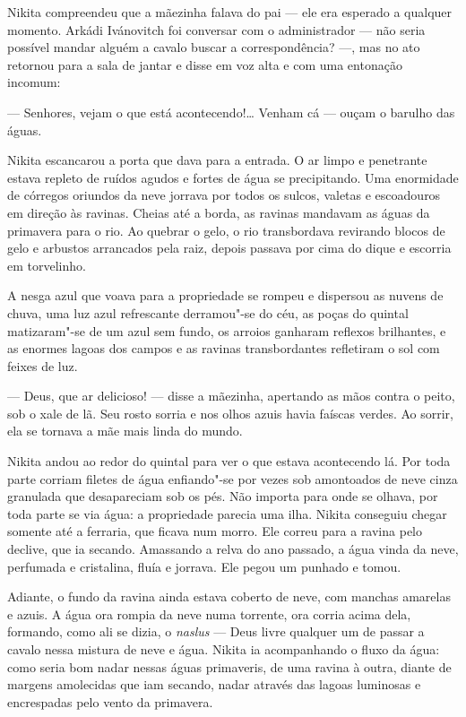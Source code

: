 Nikita compreendeu que a mãezinha falava do pai --- ele era esperado a
qualquer momento. Arkádi Ivánovitch foi conversar com o administrador
--- não seria possível mandar alguém a cavalo buscar a correspondência?
---, mas no ato retornou para a sala de jantar e disse em voz alta e com
uma entonação incomum:

--- Senhores, vejam o que está acontecendo!\ldots{} Venham cá --- ouçam o
barulho das águas.

Nikita escancarou a porta que dava para a entrada. O ar limpo e
penetrante estava repleto de ruídos agudos e fortes de água se
precipitando. Uma enormidade de córregos oriundos da neve jorrava por
todos os sulcos, valetas e escoadouros em direção às ravinas. Cheias até
a borda, as ravinas mandavam as águas da primavera para o rio. Ao quebrar
o gelo, o rio transbordava revirando blocos de gelo e arbustos
arrancados pela raiz, depois passava por cima do dique e escorria em
torvelinho.

A nesga azul que voava para a propriedade se rompeu e dispersou as
nuvens de chuva, uma luz azul refrescante derramou"-se do céu, as poças
do quintal matizaram"-se de um azul sem fundo, os arroios ganharam
reflexos brilhantes, e as enormes lagoas dos campos e as ravinas
transbordantes refletiram o sol com feixes de luz.

--- Deus, que ar delicioso! --- disse a mãezinha, apertando as mãos
contra o peito, sob o xale de lã. Seu rosto sorria e nos olhos azuis
havia faíscas verdes. Ao sorrir, ela se tornava a mãe mais linda do
mundo.

Nikita andou ao redor do quintal para ver o que estava acontecendo lá.
Por toda parte corriam filetes de água enfiando"-se por vezes sob
amontoados de neve cinza granulada que desapareciam sob os pés. Não
importa para onde se olhava, por toda parte se via água: a propriedade
parecia uma ilha. Nikita conseguiu chegar somente até a ferraria, que
ficava num morro. Ele correu para a ravina pelo declive, que ia secando.
Amassando a relva do ano passado, a água vinda da neve, perfumada e
cristalina, fluía e jorrava. Ele pegou um punhado e tomou.

Adiante, o fundo da ravina ainda estava coberto de neve, com manchas
amarelas e azuis. A água ora rompia da neve numa torrente, ora corria
acima dela, formando, como ali se dizia, o \emph{naslus} --- Deus livre
qualquer um de passar a cavalo nessa mistura de neve e água. Nikita ia
acompanhando o fluxo da água: como seria bom nadar nessas águas
primaveris, de uma ravina à outra, diante de margens amolecidas que iam
secando, nadar através das lagoas luminosas e encrespadas pelo vento da
primavera.

